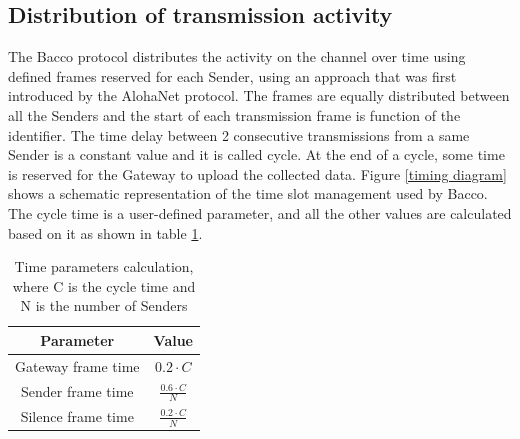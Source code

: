 \subsection{Distribution of transmission activity}
The Bacco protocol distributes the activity on the channel over time using defined frames reserved for each Sender, using
an approach that was first introduced by the AlohaNet\cite{alohanet} protocol. The frames are equally distributed between
all the Senders and the start of each transmission frame is function of the identifier. The time delay between 2 consecutive
transmissions from a same Sender is a constant value and it is called cycle. At the end of a cycle, some time is
reserved for the Gateway to upload the collected data. Figure \ref{timing diagram} shows a schematic representation of
the time slot management used by Bacco. The cycle time is a user-defined parameter, and all the other values are
calculated based on it as shown in table \ref{timing table}. \\

\begin{table}[ht]
    \centering
    \setlength{\extrarowheight}{5pt}
    \begin{tabular}{ |c|c| }
        \hline
        Parameter & Value\\
        \hline
        Gateway frame time & $0.2 \cdot C$\\
        Sender frame time & $\frac{0.6 \cdot C}{N}$\\
        Silence frame time & $\frac{0.2 \cdot C}{N}$\\
        \hline
    \end{tabular}
    \caption{Time parameters calculation, where C is the cycle time and N is the number of Senders}
    \label{timing table}
\end{table}

